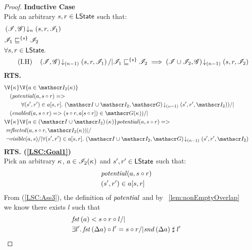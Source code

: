 \begin{lemma}
\begin{proof}
\noindent\textbf{Inductive Case}\\
Pick an arbitrary $s, r \in \textsf{LState}$ such that:
\begin{align}
	&\extendsAMUpto{\lmod, \gmod}{n}{s}{r}{\lmod_1} \label{LSC:Ass1}\\
	&\lmod_1 \weakenI{\{s\}} \lmod_2 \label{LSC:Ass2}\\
%		
	&	\for{s, r \in \LStates}  \nonumber\\
	& \tag{I.H} 
		\quad \extendsAMUpto{\lmod, \gmod}{(n-1)}{s}{r}{\lmod_1} /| \lmod_1 \weakenI{\{s\}} \lmod_2 \implies \extendsAMUpto{\lmod \cup \lmod_2, \gmod}{(n-1)}{s}{r}{\lmod_2} \label{LSC:IH}
\end{align}
%
\textbf{RTS. } 
%
\begin{align}
	& 
	\V{\ca{}}  \V{a\in \lmod_2(\ca{})} \nonumber \\
  &\quad (\m{potential}(a,s \composeL r) => \nonumber\\
  & \quad\qquad\for{(s', r') \in a[s, r]} \extendsAMUpto{\lmod \cup \lmod_2, \gmod}{(n-1)}{s'}{r'}{\lmod_2}) \label{LSC:Goal1} /| \\
%   
  &\quad (\m{enabled}(a,s \composeL r)
  => (s\composeL r, a[s \composeL r])\in \gmod(\ca{}))
  /|\null \label{LSC:Goal2}\\
%  
  &\V{\ca{}}\V{a\in \left(\lmod \cup \lmod_2 \right) (\ca{})}
  \m{potential}(a,s \composeL r) =>\null \nonumber \\
  &\ \m{reflected}(a,s \composeL r,\lmod_2(\ca{})) |/\null \nonumber \\
%  
  &\ \neg\m{visible}(a,s) /| \for{(s', r') \in a[s, r]} \extendsAMUpto{\lmod \cup \lmod_2, \gmod}{(n-1)}{s'}{r'}{\lmod_2}  \label{LSC:Goal3}
\end{align}
%
\noindent\textbf{RTS. (\ref{LSC:Goal1})} \\
Pick an arbitrary $\kappa_{}$, $a \in \mathscr{I}_2(\kappa_{})$ and $s', r' \in \textsf{LState}$ such that:
\begin{align}
	&\mathit{potential}(a, s \circ r) \label{LSC:Ass3}\\
	&(s', r') \in a[s, r] \label{LSC:Ass4}
\end{align}
From (\ref{LSC:Ass3}), the definition of $\mathit{potential}$ and by \lem~\ref{lem:nonEmptyOverlap} we know there exists $l$ such that 
%
\begin{align*}
	& \fst{a} < s \composeL r \composeL l /| \null\\
	& \exsts{l'} \fst{\updateFP{a}} \composeL l' = s \composeL r /| \snd{\updateFP{a}} \compatible l'
\end{align*}

\end{proof}
\end{lemma}
